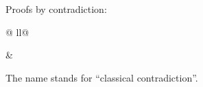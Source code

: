 \begin{isabellebody}
{%
\endisatagproof
{\isafoldproof}%
%
\isadelimproof
%
\endisadelimproof
%
}
\medskip
\begin{isamarkuptext}%
Proofs by contradiction:
\end{isamarkuptext}%
\begin{tabular}{@ {}ll@ {}}
\begin{minipage}[t]{.4\textwidth}
\end{minipage}
&
\begin{minipage}[t]{.4\textwidth}
\end{minipage}
\end{tabular}
\medskip
\begin{isamarkuptext}%
The name  stands for ``classical contradiction''.


\end{isamarkuptext}
\end{isabellebody}
